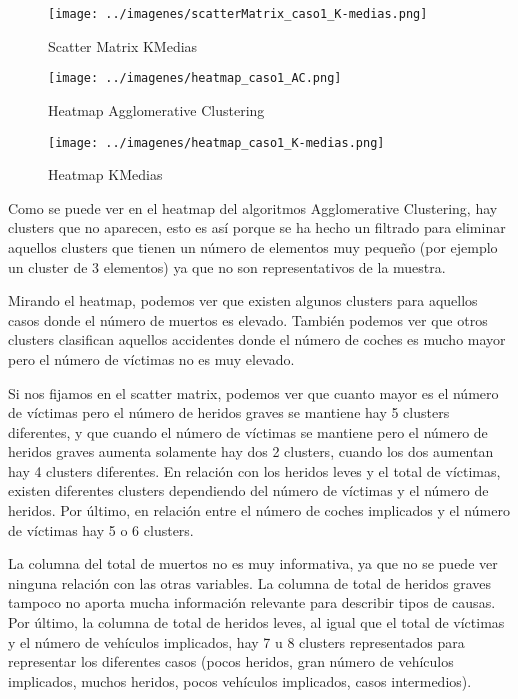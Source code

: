 	\begin{figure}[H]
		\centering
		\texttt{[image: ../imagenes/scatterMatrix\_caso1\_K-medias.png]}
		\caption{Scatter Matrix KMedias}
		\label{fig:scatter_caso1_KMedias}
	\end{figure}

	\begin{figure}[H]
		\centering
		\texttt{[image: ../imagenes/heatmap\_caso1\_AC.png]}
		\caption{Heatmap Agglomerative Clustering}
		\label{fig:hm_caso1_AC}
	\end{figure}
	
	\begin{figure}[H]
		\centering
		\texttt{[image: ../imagenes/heatmap\_caso1\_K-medias.png]}
		\caption{Heatmap KMedias}
		\label{fig:hm_caso1_KMedias}
	\end{figure}

	\vspace{0.06in}

	Como se puede ver en el heatmap del algoritmos Agglomerative Clustering, hay clusters que no aparecen, esto es así porque se ha hecho un filtrado para eliminar aquellos clusters que tienen un número de elementos muy pequeño (por ejemplo un cluster de 3 elementos) ya que no son representativos de la muestra.
	
	\vspace{0.06in}
	
	Mirando el heatmap, podemos ver que existen algunos clusters para aquellos casos donde el número de muertos es elevado. También podemos ver que otros clusters clasifican aquellos accidentes donde el número de coches es mucho mayor pero el número de víctimas no es muy elevado.
	
	\vspace{0.06in}
	Si nos fijamos en el scatter matrix, podemos ver que cuanto mayor es el número de víctimas pero el número de heridos graves se mantiene hay 5 clusters diferentes, y que cuando el número de víctimas se mantiene pero el número de heridos graves aumenta solamente hay dos 2 clusters, cuando los dos aumentan hay 4 clusters diferentes. En relación con los heridos leves y el total de víctimas, existen diferentes clusters dependiendo del número de víctimas y el número de heridos. Por último, en relación entre el número de coches implicados y el número de víctimas hay 5 o 6 clusters.
	
	\vspace{0.06in}
	La columna del total de muertos no es muy informativa, ya que no se puede ver ninguna relación con las otras variables. La columna de total de heridos graves tampoco no aporta mucha información relevante para describir tipos de causas. Por último, la columna de total de heridos leves, al igual que el total de víctimas y el número de vehículos implicados, hay 7 u 8 clusters representados para representar los diferentes casos (pocos heridos, gran número de vehículos implicados, muchos heridos, pocos vehículos implicados, casos intermedios).
	
